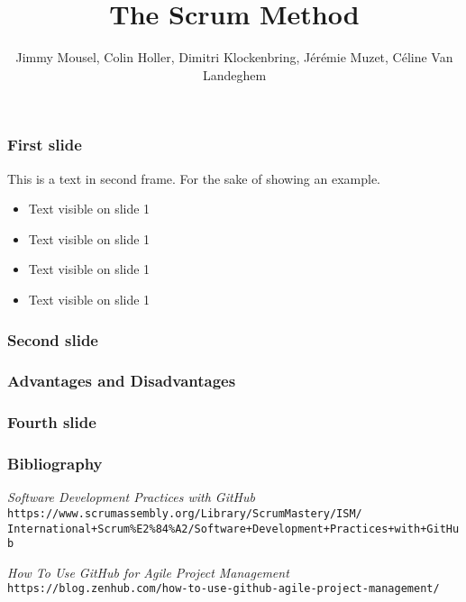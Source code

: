 \documentclass{beamer}
\title{The Scrum Method}
\author{Jimmy Mousel, Colin Holler, Dimitri Klockenbring, Jérémie Muzet, Céline Van Landeghem}
\date{}
\begin{document}
\frame{\titlepage}


\begin{frame}
    \frametitle{First slide}
    
    This is a text in second frame. 
    For the sake of showing an example.
    
    \begin{itemize}
     \item<1-> Text visible on slide 1
     \item<2-> Text visible on slide 1
     \item<3> Text visible on slide 1
     \item<4-> Text visible on slide 1
    \end{itemize}
    
\end{frame}

\begin{frame}
    \frametitle{Second slide}
    
\end{frame}

\begin{frame}
    \frametitle{Advantages and Disadvantages}

    
\end{frame}

\begin{frame}
    \frametitle{Fourth slide}
    
    
    
\end{frame}

\begin{frame}
    \frametitle{Bibliography}

	\begin{thebibliography}{10}
	
	\textit{Software Development Practices with GitHub} \\
	\texttt{https://www.scrumassembly.org/Library/ScrumMastery/ISM/\\
	International+Scrum\%E2\%84\%A2/Software+Development+Practices+with+GitHub}
	
	\textit{How To Use GitHub for Agile Project Management} \\
	\texttt{https://blog.zenhub.com/how-to-use-github-agile-project-management/}

	\end{thebibliography}
    
    
\end{frame}
\end{document}
